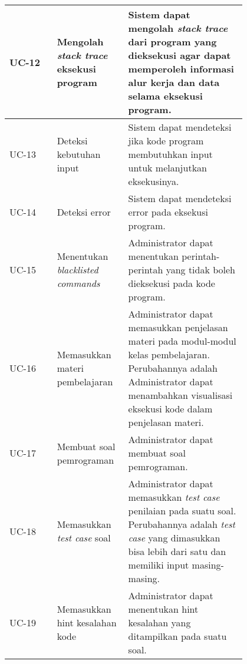 \begin{longtable}[c]{|l|>{\setlength{\baselineskip}{0.75\baselineskip}}p{0.3\linewidth}|>{\setlength{\baselineskip}{0.75\baselineskip}}p{0.5\linewidth}|}
  UC-12       & Mengolah \textit{stack trace} eksekusi program & Sistem dapat mengolah \textit{stack trace} dari program yang dieksekusi agar dapat memperoleh informasi alur kerja dan data selama eksekusi program.                                                                                                                                 \\ \hline
  UC-13       & Deteksi kebutuhan input                        & Sistem dapat mendeteksi jika kode program membutuhkan input untuk melanjutkan eksekusinya.                                                                                                                                                                                           \\ \hline
  UC-14       & Deteksi error                                  & Sistem dapat mendeteksi error pada eksekusi program.                                                                                                                                                                                                                                 \\ \hline
  UC-15       & Menentukan \textit{blacklisted commands}       & Administrator dapat menentukan perintah-perintah yang tidak boleh dieksekusi pada kode program.                                                                                                                                                                                      \\ \hline
  UC-16       & Memasukkan materi pembelajaran                 & Administrator dapat memasukkan penjelasan materi pada modul-modul kelas pembelajaran. Perubahannya adalah Administrator dapat menambahkan visualisasi eksekusi kode dalam penjelasan materi.                                                                                         \\ \hline
  UC-17       & Membuat soal pemrograman                       & Administrator dapat membuat soal pemrograman.                                                                                                                                                                                                                                        \\ \hline
  UC-18       & Memasukkan \textit{test case} soal             & Administrator dapat memasukkan \textit{test case} penilaian pada suatu soal. Perubahannya adalah \textit{test case} yang dimasukkan bisa lebih dari satu dan memiliki input masing-masing.                                                                                           \\ \hline
  UC-19       & Memasukkan hint kesalahan kode                 & Administrator dapat menentukan hint kesalahan yang ditampilkan pada suatu soal.                                                                                                                                                                                                      \\ \hline
\end{longtable}

